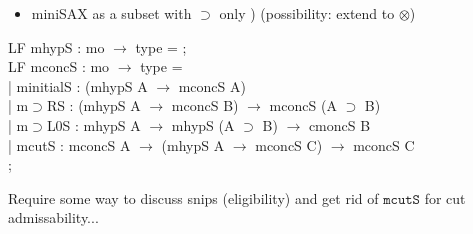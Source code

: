 \documentclass[9ps]{beamer}
\begin{document}
\begin{frame}


\begin{itemize}
    \item  miniSAX as a subset with $\supset$ only \checkmark) (possibility: extend to $\otimes$)
\end{itemize}

 { \scriptsize
\ttfamily

LF mhypS : mo $\to$ type = ;\\
LF mconcS : mo $\to$ type =\\[4pt]

\quad | minitialS : (mhypS A $\to$ mconcS A)\\
\quad | m$\supset$RS : (mhypS A $\to$ mconcS B) $\to$ mconcS (A $\supset$ B)\\
\quad | m$\supset$L0S : mhypS A $\to$ mhypS (A $\supset$ B) $\to$ cmoncS B\\
\quad | mcutS : mconcS A $\to$ (mhypS A $\to$ mconcS C) $\to$ mconcS C\\

;}

\pause

Require some way to discuss snips (eligibility) and get rid of $\texttt{mcutS}$ for cut admissability...


\end{frame}
\end{document}
